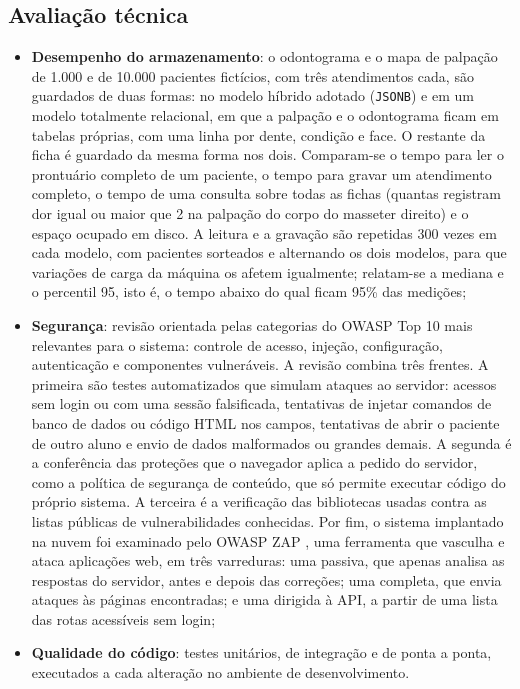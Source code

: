 \subsection{Avaliação técnica}
\label{sec:exp-tecnica}

\begin{itemize}
	\item \textbf{Desempenho do armazenamento}: o odontograma e o mapa de palpação de 1.000 e de 10.000 pacientes fictícios, com três atendimentos cada, são guardados de duas formas: no modelo híbrido adotado (\texttt{JSONB}) e em um modelo totalmente relacional, em que a palpação e o odontograma ficam em tabelas próprias, com uma linha por dente, condição e face. O restante da ficha é guardado da mesma forma nos dois. Comparam-se o tempo para ler o prontuário completo de um paciente, o tempo para gravar um atendimento completo, o tempo de uma consulta sobre todas as fichas (quantas registram dor igual ou maior que 2 na palpação do corpo do masseter direito) e o espaço ocupado em disco. A leitura e a gravação são repetidas 300 vezes em cada modelo, com pacientes sorteados e alternando os dois modelos, para que variações de carga da máquina os afetem igualmente; relatam-se a mediana e o percentil 95, isto é, o tempo abaixo do qual ficam 95\% das medições;
	\item \textbf{Segurança}: revisão orientada pelas categorias do OWASP Top 10 \cite{owasp-top10} mais relevantes para o sistema: controle de acesso, injeção, configuração, autenticação e componentes vulneráveis. A revisão combina três frentes. A primeira são testes automatizados que simulam ataques ao servidor: acessos sem login ou com uma sessão falsificada, tentativas de injetar comandos de banco de dados ou código HTML nos campos, tentativas de abrir o paciente de outro aluno e envio de dados malformados ou grandes demais. A segunda é a conferência das proteções que o navegador aplica a pedido do servidor, como a política de segurança de conteúdo, que só permite executar código do próprio sistema. A terceira é a verificação das bibliotecas usadas contra as listas públicas de vulnerabilidades conhecidas. Por fim, o sistema implantado na nuvem foi examinado pelo OWASP ZAP \cite{zap}, uma ferramenta que vasculha e ataca aplicações web, em três varreduras: uma passiva, que apenas analisa as respostas do servidor, antes e depois das correções; uma completa, que envia ataques às páginas encontradas; e uma dirigida à API, a partir de uma lista das rotas acessíveis sem login;
	\item \textbf{Qualidade do código}: testes unitários, de integração e de ponta a ponta, executados a cada alteração no ambiente de desenvolvimento.
\end{itemize}

